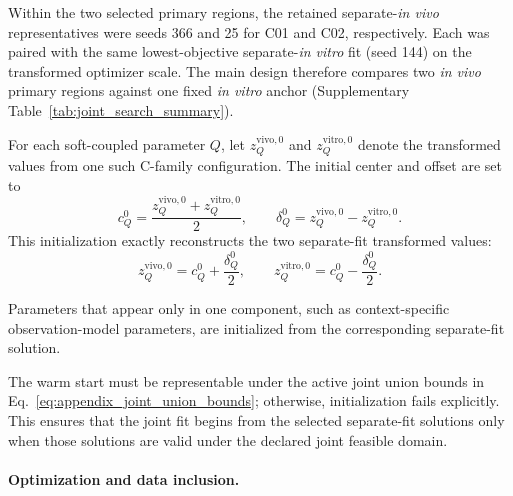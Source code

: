 \documentclass[11pt]{article}
\begin{document}
Within the two selected primary regions, the retained separate-\textit{in vivo} representatives were seeds 366 and 25 for C01 and C02, respectively. Each was paired with the same lowest-objective separate-\textit{in vitro} fit (seed 144) on the transformed optimizer scale. The main design therefore compares two \textit{in vivo} primary regions against one fixed \textit{in vitro} anchor (Supplementary Table~\ref{tab:joint_search_summary}).

For each soft-coupled parameter $Q$, let $z_Q^{\mathrm{vivo},0}$ and $z_Q^{\mathrm{vitro},0}$ denote the transformed values from one such C-family configuration. The initial center and offset are set to
\begin{equation}
c_Q^{0} = \frac{z_Q^{\mathrm{vivo},0} + z_Q^{\mathrm{vitro},0}}{2}, \qquad \delta_Q^{0} = z_Q^{\mathrm{vivo},0} - z_Q^{\mathrm{vitro},0}.
\label{eq:appendix_joint_warm_start_soft}
\end{equation}
This initialization exactly reconstructs the two separate-fit transformed values:
\[
z_Q^{\mathrm{vivo},0} = c_Q^0+\frac{\delta_Q^0}{2}, \qquad z_Q^{\mathrm{vitro},0} = c_Q^0-\frac{\delta_Q^0}{2}.
\]

Parameters that appear only in one component, such as context-specific observation-model parameters, are initialized from the corresponding separate-fit solution.

The warm start must be representable under the active joint union bounds in Eq.~\eqref{eq:appendix_joint_union_bounds}; otherwise, initialization fails explicitly. This ensures that the joint fit begins from the selected separate-fit solutions only when those solutions are valid under the declared joint feasible domain.


\paragraph{Optimization and data inclusion.}
\end{document}
